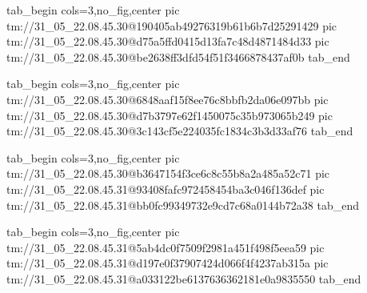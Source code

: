 \ifcmt
  tab_begin cols=3,no_fig,center
    pic tm://31_05_22.08.45.30@190405ab49276319b61b6b7d25291429
    pic tm://31_05_22.08.45.30@d75a5ffd0415d13fa7c48d4871484d33
    pic tm://31_05_22.08.45.30@be2638ff3dfd54f51f3466878437af0b
  tab_end
\fi


\ifcmt
  tab_begin cols=3,no_fig,center
    pic tm://31_05_22.08.45.30@6848aaf15f8ee76c8bbfb2da06e097bb
    pic tm://31_05_22.08.45.30@d7b3797e62f1450075c35b973065b249
    pic tm://31_05_22.08.45.30@3c143cf5e224035fc1834c3b3d33af76
  tab_end
\fi


\ifcmt
  tab_begin cols=3,no_fig,center
    pic tm://31_05_22.08.45.30@b3647154f3ce6c8c55b8a2a485a52c71
    pic tm://31_05_22.08.45.31@93408fafc972458454ba3c046f136def
    pic tm://31_05_22.08.45.31@bb0fc99349732e9cd7c68a0144b72a38
  tab_end
\fi


\ifcmt
  tab_begin cols=3,no_fig,center
    pic tm://31_05_22.08.45.31@5ab4dc0f7509f2981a451f498f5eea59
    pic tm://31_05_22.08.45.31@d197e0f37907424d066f4f4237ab315a
    pic tm://31_05_22.08.45.31@a033122be6137636362181e0a9835550
  tab_end
\fi

